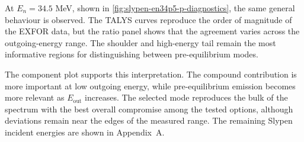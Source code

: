 At $E_n=34.5$ MeV, shown in \cref{fig:slypen-en34p5-p-diagnostics}, the same general behaviour is observed. The TALYS curves reproduce the order of magnitude of the EXFOR data, but the ratio panel shows that the agreement varies across the outgoing-energy range. The shoulder and high-energy tail remain the most informative regions for distinguishing between pre-equilibrium modes.

The component plot supports this interpretation. The compound contribution is more important at low outgoing energy, while pre-equilibrium emission becomes more relevant as $E_{\mathrm{out}}$ increases. The selected mode reproduces the bulk of the spectrum with the best overall compromise among the tested options, although deviations remain near the edges of the measured range. The remaining Slypen incident energies are shown in Appendix~A.

